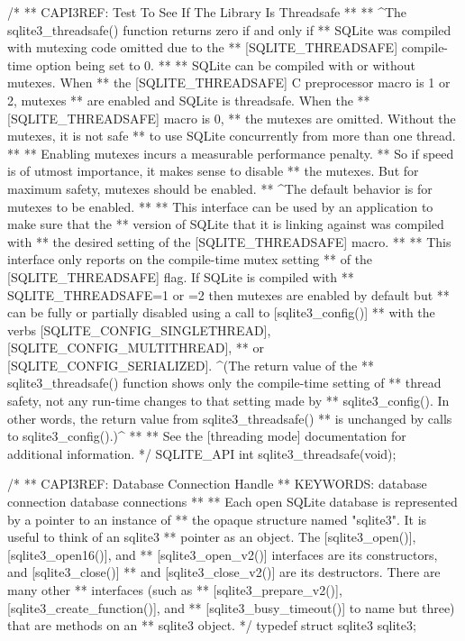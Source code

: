 \begin{Codex}[label=sqlite3.h,numbers=left]
{/*
** CAPI3REF: Test To See If The Library Is Threadsafe
**
** ^The sqlite3_threadsafe() function returns zero if and only if
** SQLite was compiled with mutexing code omitted due to the
** [SQLITE_THREADSAFE] compile-time option being set to 0.
**
** SQLite can be compiled with or without mutexes.  When
** the [SQLITE_THREADSAFE] C preprocessor macro is 1 or 2, mutexes
** are enabled and SQLite is threadsafe.  When the
** [SQLITE_THREADSAFE] macro is 0, 
** the mutexes are omitted.  Without the mutexes, it is not safe
** to use SQLite concurrently from more than one thread.
**
** Enabling mutexes incurs a measurable performance penalty.
** So if speed is of utmost importance, it makes sense to disable
** the mutexes.  But for maximum safety, mutexes should be enabled.
** ^The default behavior is for mutexes to be enabled.
**
** This interface can be used by an application to make sure that the
** version of SQLite that it is linking against was compiled with
** the desired setting of the [SQLITE_THREADSAFE] macro.
**
** This interface only reports on the compile-time mutex setting
** of the [SQLITE_THREADSAFE] flag.  If SQLite is compiled with
** SQLITE_THREADSAFE=1 or =2 then mutexes are enabled by default but
** can be fully or partially disabled using a call to [sqlite3_config()]
** with the verbs [SQLITE_CONFIG_SINGLETHREAD], [SQLITE_CONFIG_MULTITHREAD],
** or [SQLITE_CONFIG_SERIALIZED].  ^(The return value of the
** sqlite3_threadsafe() function shows only the compile-time setting of
** thread safety, not any run-time changes to that setting made by
** sqlite3_config(). In other words, the return value from sqlite3_threadsafe()
** is unchanged by calls to sqlite3_config().)^
**
** See the [threading mode] documentation for additional information.
*/
SQLITE_API int sqlite3_threadsafe(void);

/*
** CAPI3REF: Database Connection Handle
** KEYWORDS: {database connection} {database connections}
**
** Each open SQLite database is represented by a pointer to an instance of
** the opaque structure named "sqlite3".  It is useful to think of an sqlite3
** pointer as an object.  The [sqlite3_open()], [sqlite3_open16()], and
** [sqlite3_open_v2()] interfaces are its constructors, and [sqlite3_close()]
** and [sqlite3_close_v2()] are its destructors.  There are many other
** interfaces (such as
** [sqlite3_prepare_v2()], [sqlite3_create_function()], and
** [sqlite3_busy_timeout()] to name but three) that are methods on an
** sqlite3 object.
*/
typedef struct sqlite3 sqlite3;

}
\end{Codex}
